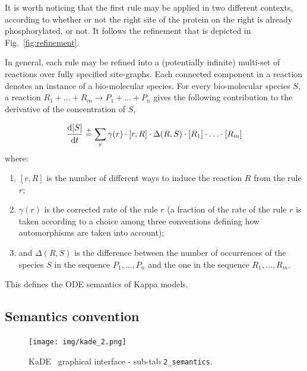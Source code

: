 \documentclass[11pt]{book}
\def\KaDE{\textsf{KaDE}}
\begin{document}
It is worth noticing that the first rule may be applied in two different contexts, according to whether or not the right site  of the protein on the right  is already phosphorylated, or not. It follows the refinement that is depicted in Fig.~\ref{fig:refinement}.

In general, each rule may be refined into a (potentially infinite) multi-set of reactions over fully specified site-graphs.
Each connected component in a reaction denotes an instance of a bio-molecular species. For every bio-molecular species $S$, a reaction $R_1 + \ldots + R_m {\rightarrow} P_1 + \ldots + P_n$ gives the following contribution to the derivative of the concentration of $S$,

\newcommand{\myfrac}[2]{\frac{\strut \displaystyle #1}{\strut \displaystyle #2}}
\newcommand{\diff}[1]{\myfrac{\mathrm{d}#1}{\mathrm{d}t}}

\begin{equation*}
  \diff{[S]} \stackrel{+}= \sum_r \gamma(r)\cdot[r,R]\cdot\Delta(R,S)\cdot [R_1] \cdot \ldots \cdot [R_m]
\end{equation*}
where:
\begin{enumerate}
  \item $[r,R]$ is the number of different ways to induce the reaction $R$ from the rule $r$;
  \item $\gamma(r)$ is the corrected rate of the rule $r$ (a fraction of the rate of the rule $r$ is taken according to a choice among three  conventions defining how automorphisms are taken into account);
  \item and $\Delta(R,S)$ is the difference between the number of occurrences of the species $S$ in the sequence $P_1,\ldots,P_n$ and
the one in the sequence $R_1,\ldots,R_m$.
 \end{enumerate}

 This defines the ODE semantics of Kappa models.

\subsection{Semantics convention}

\begin{figure}[htbp]
\centering
\texttt{[image: img/kade\_2.png]}
\caption{\KaDE~ graphical interface - sub-tab \texttt{2\_semantics}.}
\label{fig:kade:2}
\end{figure}
\end{document}
